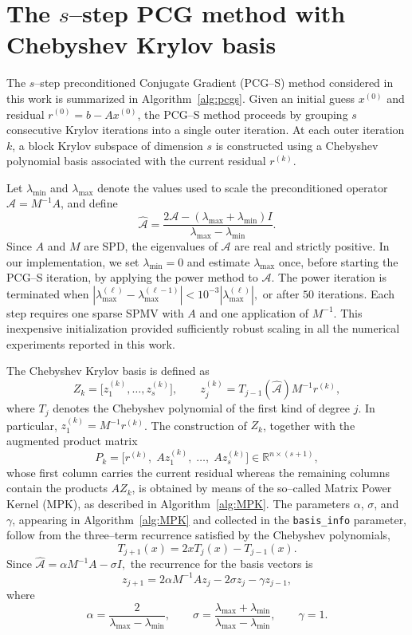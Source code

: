 \documentclass[pdflatex,sn-mathphys-num]{sn-jnl}%
\begin{document}
\section{The $s$--step PCG method with Chebyshev Krylov basis}
\label{sec:sPCG-cheb}

The $s$--step preconditioned Conjugate Gradient (PCG--S) method considered in this work is summarized in Algorithm~\ref{alg:pcgs}.
Given an initial guess $x^{(0)}$ and residual $r^{(0)} = b - Ax^{(0)}$, the PCG--S method proceeds by grouping
$s$ consecutive Krylov iterations into a single outer iteration.
At each outer iteration $k$, a block Krylov subspace of dimension $s$ is
constructed using a Chebyshev polynomial basis associated with the current
residual $r^{(k)}$.

Let $\lambda_{\min}$ and $\lambda_{\max}$ denote the
values used to scale the preconditioned operator
$\mathcal{A}=M^{-1}A$, and define
\[
\widehat{\mathcal A}
=
\frac{2\mathcal{A}-(\lambda_{\max}+\lambda_{\min})I}
     {\lambda_{\max}-\lambda_{\min}}.
\]
Since $A$ and $M$ are SPD, the eigenvalues of $\mathcal{A}$ are real
and strictly positive. In our implementation, we set
$\lambda_{\min}=0$ and estimate $\lambda_{\max}$ once, before
starting the PCG--S iteration, by applying the power method to
$\mathcal{A}$. The power iteration is terminated when
$
\left|\lambda_{\max}^{(\ell)}
-\lambda_{\max}^{(\ell-1)}\right|
<
10^{-3}\left|\lambda_{\max}^{(\ell)}\right|,$
or after $50$ iterations. Each step requires one sparse
SPMV with $A$ and one application of $M^{-1}$.
This inexpensive initialization provided sufficiently robust scaling
in all the numerical experiments reported in this work.

The Chebyshev Krylov basis is defined as
\[
Z_k =
\bigl[
z_1^{(k)}, \dots, z_s^{(k)}
\bigr],
\qquad
z_j^{(k)}
=
T_{j-1}(\widehat{\mathcal A})M^{-1}r^{(k)},
\]
where $T_j$ denotes the Chebyshev polynomial of the first kind of
degree $j$. In particular, $z_1^{(k)}=M^{-1}r^{(k)}$.
The construction of $Z_k$, together with the augmented product matrix
\[
  P_k = \bigl[r^{(k)},\; Az_1^{(k)},\;\dots,\; Az_s^{(k)}\bigr] \in \mathbb{R}^{n\times(s+1)},
\]
whose first column carries the current residual whereas the remaining columns contain the products $AZ_k$, is obtained by means of the so--called Matrix Power Kernel (MPK), as described in Algorithm~\ref{alg:MPK}.
The parameters $\alpha$, $\sigma$, and $\gamma$, appearing in
Algorithm~\ref{alg:MPK} and collected in the \texttt{basis\_info} parameter, follow from the three--term recurrence
satisfied by the Chebyshev polynomials,
\[
T_{j+1}(x)=2xT_j(x)-T_{j-1}(x).
\]
Since $\widehat{\mathcal A}=\alpha M^{-1}A-\sigma I,$
the recurrence for the basis vectors is
\[
z_{j+1}
=
2\alpha M^{-1}Az_j
-
2\sigma z_j
-
\gamma z_{j-1},
\]
where
\[
\alpha =
\frac{2}{\lambda_{\max}-\lambda_{\min}},
\qquad
\sigma =
\frac{\lambda_{\max}+\lambda_{\min}}
     {\lambda_{\max}-\lambda_{\min}},
\qquad
\gamma=1.
\]
\end{document}
